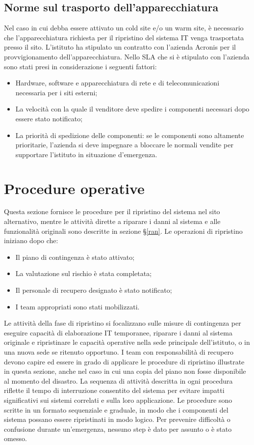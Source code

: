 \documentclass[12pt, a4paper, titlepage]{report}
\newcommand{\vendor}{Acronis} %
\begin{document}
	\subsection{Norme sul trasporto dell'apparecchiatura} \label{trasporto}
	
	Nel caso in cui debba essere attivato un cold site e/o un warm site, è necessario che l'apparecchiatura richiesta per il ripristino del sistema IT venga trasportata presso il sito. L'istituto ha stipulato un contratto con l'azienda \vendor{} per il provvigionamento dell'apparecchiatura. Nello SLA che si è stipulato con l'azienda sono stati presi in considerazione i seguenti fattori:
	\begin{itemize}
		\item Hardware, software e apparecchiatura di rete e di telecomunicazioni necessaria per i siti esterni;
		\item La velocità con la quale il venditore deve spedire i componenti necessari dopo essere stato notificato;
		\item La priorità di spedizione delle componenti: se le componenti sono altamente prioritarie, l'azienda si deve impegnare a bloccare le normali vendite per supportare l'istituto in situazione d'emergenza.
	\end{itemize}
	
	\newpage
	
	\section{Procedure operative}
	Questa sezione fornisce le procedure per il ripristino del sistema nel sito alternativo, mentre le attività dirette a riparare i danni al sistema e alle funzionalità originali sono descritte in sezione §\ref{ran}.
	Le operazioni di ripristino iniziano dopo che:
	\begin{itemize}
		\item Il piano di contingenza è stato attivato;
		\item La valutazione sul rischio è stata completata;
		\item Il personale di recupero designato è stato notificato;
		\item I team appropriati sono stati mobilizzati.
	\end{itemize}
	Le attività della fase di ripristino si focalizzano sulle misure di contingenza per eseguire capacità di elaborazione IT temporanee, riparare i danni al sistema originale e ripristinare le capacità operative nella sede principale dell'istituto, o in una nuova sede se ritenuto opportuno.
	I team con responsabilità di recupero devono capire ed essere in grado di applicare le procedure di ripristino illustrate in questa sezione, anche nel caso in cui una copia del piano non fosse disponibile al momento del disastro.
	La sequenza di attività descritta in ogni procedura riflette il tempo di interruzione consentito del sistema per evitare impatti significativi sui sistemi correlati e sulla loro applicazione. Le procedure sono scritte in un formato sequenziale e graduale, in modo che i componenti del sistema possano essere ripristinati in modo logico. Per prevenire difficoltà o confusione durante un'emergenza, nessuno step è dato per assunto o è stato omesso.
	
\end{document}
